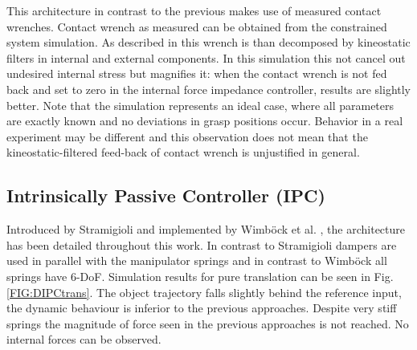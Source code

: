 \documentclass[a4paper,twoside, openright,12pt]{report}
\begin{document}


This architecture in contrast to the previous makes use of measured contact wrenches. Contact wrench as measured can be obtained from the constrained system simulation. As described in \cite{CoopManipHandbook} this wrench is than decomposed by kineostatic filters in internal and external components. In this simulation this not cancel out undesired internal stress but magnifies it: when the contact wrench is not fed back and set to zero in the internal force impedance controller, results are slightly better. Note that the simulation represents an ideal case, where all parameters are exactly known and no deviations in grasp positions occur. Behavior in a real experiment may be different and this observation does not mean that the kineostatic-filtered feed-back of contact wrench is unjustified in general.



\subsection{Intrinsically Passive Controller (IPC)}
Introduced by Stramigioli \cite{Stramigioli_01} and implemented by Wimb\"ock et al. \cite{Wimboeck_08}, the architecture has been detailed throughout this work. In contrast to Stramigioli dampers are used in parallel with the manipulator springs and in contrast to Wimb\"ock all springs have 6-DoF. Simulation results for pure translation can be seen in Fig. \ref{FIG:DIPCtrans}. The object trajectory falls slightly behind the reference input, the dynamic behaviour is inferior to the previous approaches. Despite very stiff springs the magnitude of force seen in the previous approaches is not reached. No internal forces can be observed.
\end{document}

